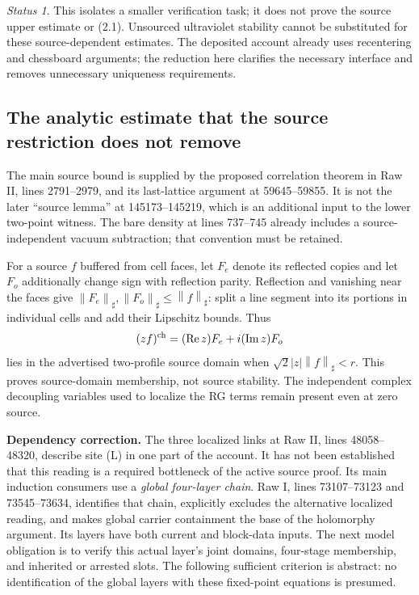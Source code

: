 \documentclass[11pt]{article}
\theoremstyle{remark}
\newtheorem*{status}{Status}
\newcommand{\Rea}{\operatorname{Re}}
\newcommand{\Ima}{\operatorname{Im}}
\newcommand{\norm}[1]{\left\|#1\right\|}
\begin{document}
\begin{status}
This isolates a smaller verification task; it does not prove the source
upper estimate or (2.1). Unsourced ultraviolet stability cannot be
substituted for these source-dependent estimates. The deposited account
already uses recentering and chessboard arguments; the reduction here
clarifies the necessary interface and removes unnecessary uniqueness
requirements.
\end{status}

\subsection{The analytic estimate that the source restriction does not remove}

The main source bound is supplied by the proposed correlation theorem in
Raw II, lines 2791--2979, and its last-lattice argument at
59645--59855. It is not the later ``source lemma'' at
145173--145219, which is an additional input to the lower two-point
witness. The bare density at lines 737--745 already includes a
source-independent vacuum subtraction; that convention must be retained.

For a source $f$ buffered from cell faces, let $F_e$ denote its reflected
copies and let $F_o$ additionally change sign with reflection parity.
Reflection and vanishing near the faces give
$\norm{F_e}_\sharp,\norm{F_o}_\sharp\leq\norm f_\sharp$:
split a line segment into its portions in individual cells and add their
Lipschitz bounds. Thus
\[
 (zf)^{\rm ch}=(\Rea z)F_e+i(\Ima z)F_o
\]
lies in the advertised two-profile source domain when
$\sqrt2|z|\norm f_\sharp<r$. This proves source-domain membership,
not source stability. The independent complex decoupling variables
used to localize the RG terms remain present even at zero source.

\textbf{Dependency correction.}
The three localized links at Raw II, lines 48058--48320, describe site
(L) in one part of the account. It has not been established that this
reading is a required bottleneck of the active source proof. Its main
induction consumers use
a \emph{global four-layer chain}. Raw I, lines 73107--73123 and
73545--73634, identifies that chain, explicitly excludes the alternative
localized reading, and makes global carrier containment the base of
the holomorphy argument. Its layers have both current and block-data
inputs. The next model obligation is to verify this actual layer's
joint domains, four-stage membership, and inherited or arrested slots.
The following sufficient criterion is abstract: no identification of
the global layers with these fixed-point equations is presumed.
\end{document}
